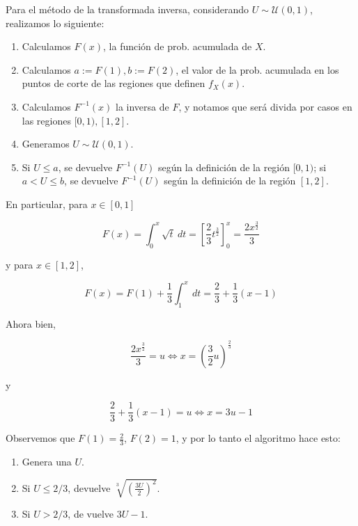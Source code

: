 \documentclass[a4paper, 12pt]{article}
\begin{document}
Para el método de la transformada inversa, considerando $U \sim \mathcal{U}(0,
1)$, realizamos lo siguiente:

\begin{enumerate}
  \item Calculamos $F(x)$, la función de prob. acumulada de $X$. 
  \item
    Calculamos $a := F(1), b := F(2)$, el valor de la prob. acumulada en los
    puntos de corte de las regiones que definen $f_X(x)$.
  \item Calculamos $F^{-1}(x)$ la inversa de $F$, y notamos que será divida por
    casos en las regiones $[0, 1), [1, 2]$.
  \item Generamos $U \sim \mathcal{U}(0, 1)$.  
  \item Si $U \leq a$, se devuelve $F^{-1}(U)$ según la definición de la región
    $[0, 1)$; si $a < U \leq b$, se devuelve
    $F^{-1}(U)$ según la definición de la región $[1, 2]$.
\end{enumerate}

En particular, para $x \in [0, 1]$

\begin{equation*}
  F(x) = \int_0^x \sqrt{t} ~ dt = \left[ \frac{2}{3} t^{\frac{3}{2}} \right]_0^x =
\frac{2x^{\frac{3}{2}}}{3}
\end{equation*}

y para $x \in [1, 2]$,

\begin{equation*}
  F(x) = F(1) + \frac{1}{3}\int_1^x ~ dt = \frac{2}{3} + \frac{1}{3}(x-1)
\end{equation*}

Ahora bien, 

\begin{equation*}
  \frac{2x^{\frac{3}{2}}}{3} = u \iff x = \left( \frac{3}{2}u \right)^{\frac{2}{3}}
\end{equation*}

y 

\begin{equation*}
  \frac{2}{3} + \frac{1}{3}(x-1) = u \iff x = 3u - 1
\end{equation*}

Observemos que $F(1) = \frac{2}{3}$, $F(2) = 1$, y por lo
tanto el algoritmo hace esto:

\begin{enumerate}
  \item Genera una $U$. 
  \item Si $U \leq 2 / 3$, devuelve $\sqrt[3]{\left( \frac{3U}{2} \right)^2 }$. 
  \item Si $U> 2 /3$, de vuelve $3U - 1$.
\end{enumerate}
\end{document}
